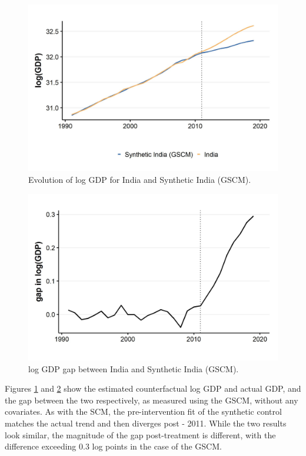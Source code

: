 \documentclass[12pt,nobind, a4paper]{reedthesis}
\begin{document}
 \newpage
 \begin{figure}

 {\centering \includegraphics[width=1\linewidth]{figure/indiagsynth} 

 }

 \caption{Evolution of log GDP for India and Synthetic India (GSCM).}\label{fig:indgsyn}
 \end{figure}
 \begin{figure}

 {\centering \includegraphics[width=1\linewidth]{figure/indiagsynthgap} 

 }

 \caption{log GDP gap between India and Synthetic India (GSCM).}\label{fig:indgsyngap}
 \end{figure}
 Figures \ref{fig:indgsyn} and \ref{fig:indgsyngap} show the estimated counterfactual log GDP and actual GDP, and the gap between the two respectively, as measured using the GSCM, without any covariates. As with the SCM, the pre-intervention fit of the synthetic control matches the actual trend and then diverges post - 2011. While the two results look similar, the magnitude of the gap post-treatment is different, with the difference exceeding 0.3 log points in the case of the GSCM.
\end{document}
